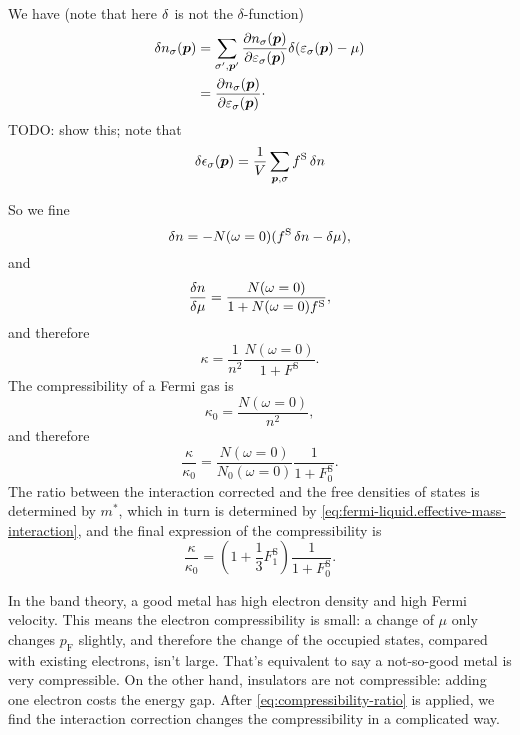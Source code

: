 \documentclass[hyperref, a4paper]{article}
\newcommand*{\pfermi}{p_{\text{F}}}
\begin{document}
We have  (note that here $\var{}$ is not the $\delta$-function)
\[
    \begin{aligned}
        \var{n_\sigma(\vb*{p})} &= 
        \sum_{\sigma', \vb*{p}'}
        \pdv{n_\sigma(\vb*{p})}{\varepsilon_{\sigma}(\vb*{p})} \delta(\varepsilon_\sigma(\vb*{p}) - \mu) \\
        &= \pdv{n_\sigma(\vb*{p})}{\varepsilon_{\sigma}(\vb*{p})}
        \cdot 
    \end{aligned}
\]
TODO: show this; note that 
\[
    \var{\epsilon_\sigma(\vb*{p})} = \frac{1}{V} \sum_{\vb*{p}, \sigma} f^{\text{S}} \var{n}
\]

So we fine 
\begin{equation}
    \var{n} = - N(\omega = 0) (f^{\text{S}} \var{n} - \var{\mu}),
\end{equation}
and 
\begin{equation}
    \fdv{n}{\mu} = \frac{N(\omega = 0)}{1 + N(\omega = 0) f^{\text{S}}} ,
\end{equation}
and therefore 
\begin{equation}
    \kappa = \frac{1}{n^2} \frac{N(\omega = 0)}{1 + F^{\text{S}}}.
\end{equation}
The compressibility of a Fermi gas is 
\begin{equation}
    \kappa_0 = \frac{N(\omega = 0)}{n^2},
\end{equation}
and therefore 
\begin{equation}
    \frac{\kappa}{\kappa_0} = \frac{N(\omega = 0)}{N_0(\omega = 0)} \frac{1}{1 + F^{\text{S}}_0}.
\end{equation}
The ratio between the interaction corrected and the free densities of states 
is determined by $m^*$,
which in turn is determined by \eqref{eq:fermi-liquid.effective-mass-interaction},
and the final expression of the compressibility is 
\begin{equation}
    \frac{\kappa}{\kappa_0} = \left(
        1 + \frac{1}{3} F_1^{\text{S}}
    \right) \frac{1}{1 + F^{\text{S}}_0}.
    \label{eq:compressibility-ratio}
\end{equation}

In the band theory,
a good metal has high electron density and high Fermi velocity.
This means the electron compressibility is small:
a change of $\mu$ only changes $\pfermi$ slightly, 
and therefore the change of the occupied states,
compared with existing electrons, 
isn't large. 
That's equivalent to say a not-so-good metal 
is very compressible.
On the other hand, 
insulators are not compressible:
adding one electron costs the energy gap. 
After \eqref{eq:compressibility-ratio} is applied, 
we find the interaction correction 
changes the compressibility in a complicated way.
\end{document}
